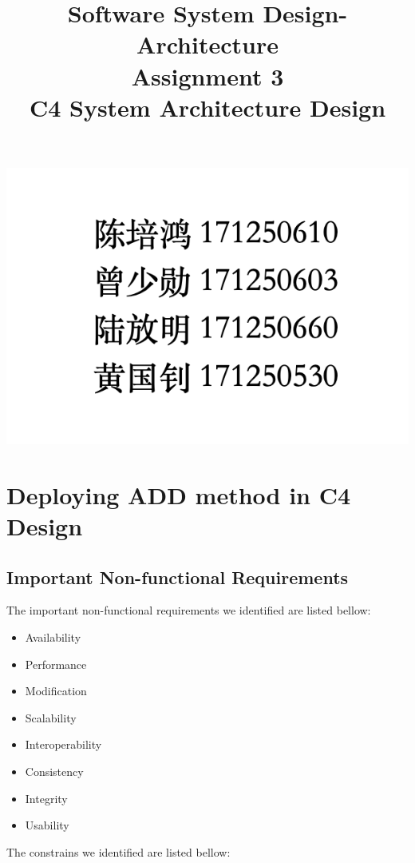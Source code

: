\documentclass{article}
\title{Software System Design-Architecture\\Assignment 3\\C4 System Architecture Design}
\date{}
\begin{document}
	\maketitle
	\begin{center}
	\includegraphics[scale=0.5]{authors.png}
	\end{center}
	\tableofcontents
	\section{Deploying ADD method in C4 Design}
	\subsection{Important Non-functional Requirements}
	The important non-functional requirements we identified are listed bellow:
	\begin{itemize}
		\item {Availability}
		\item {Performance}
		\item {Modification}
		\item {Scalability}
		\item {Interoperability}
		\item {Consistency}
		\item {Integrity}
		\item {Usability}
	\end{itemize}
	The constrains we identified are listed bellow:
\end{document}
